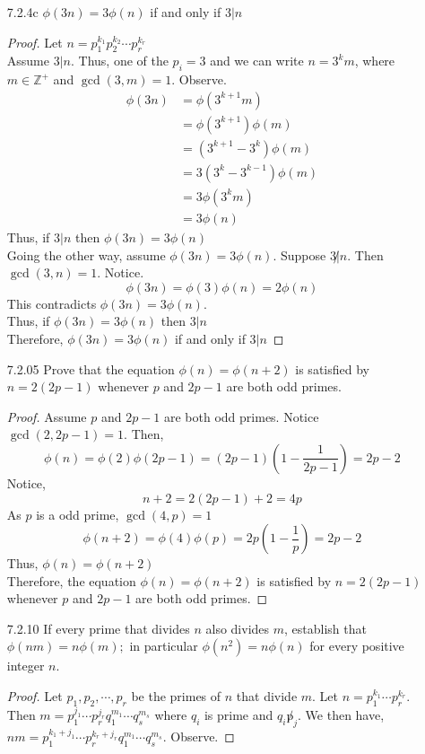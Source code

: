 \documentclass[12pt]{article}
\newcommand{\Z}{\mathds{Z}}
\begin{document}
\begin{enumerate}
	\item[7.2.4c] $ \phi(3n)=3\phi(n) $ if and only if $ 3|n $
	\begin{proof}
		Let $ n = p_1^{k_1}p_2^{k_2} \cdots p_r^{k_r} $\\
		Assume $ 3|n $. Thus, one of the $ p_i = 3 $ and we can write $ n = 3^km $, where $ m \in \Z^+ $ and $ \gcd(3,m) =1 $. Observe. 
		\begin{align*}
			\phi(3n) &= \phi(3^{k+1}m) \\
					 &= \phi(3^{k+1})\phi(m)\\
					 &= (3^{k+1}-3^k)\phi(m)\\
					 &= 3(3^k-3^{k-1})\phi(m)\\
					 &= 3\phi(3^km)\\
					 &= 3\phi(n)
		\end{align*}
		Thus, if $ 3|n $ then $ \phi(3n)=3\phi(n) $ 
		\\
		Going the other way, assume $ \phi(3n)=3\phi(n) $. Suppose $ 3 \not| n $. Then $ \gcd(3,n) =1 $. Notice.
			\[\phi(3n)=\phi(3)\phi(n)=2\phi(n)\]
		This contradicts  $ \phi(3n)=3\phi(n) $.\\
		Thus, if  $ \phi(3n)=3\phi(n) $ then $ 3|n $\\
		Therefore, $ \phi(3n)=3\phi(n) $ if and only if $ 3|n $
	\end{proof}
	\item[7.2.05] Prove that the equation $ \phi(n)=\phi(n+2) $ is satisfied by $ n=2(2p-1) $ whenever $ p $ and $ 2p-1$ are both odd primes.
		\begin{proof}
			Assume $ p $ and $ 2p-1 $ are both odd primes. Notice $ \gcd(2,2p-1)=1 $. Then,
			 \[\phi(n) = \phi(2)\phi(2p-1) = (2p-1)(1-\frac{1}{2p-1}) = 2p-2\]
			Notice, 
			\[n+2=2(2p-1)+2=4p\]
			As $ p $ is a odd prime, $ \gcd(4,p)=1 $
			\[\phi(n+2) = \phi(4)\phi(p)=2p(1-\frac{1}{p})=2p-2\]
			Thus, $ \phi(n)=\phi(n+2) $\\
			Therefore,  the equation $ \phi(n)=\phi(n+2) $ is satisfied by $ n=2(2p-1) $ whenever $ p $ and $ 2p-1$ are both odd primes.
		\end{proof}
	\item[7.2.10] If every prime that divides $ n $ also divides $ m $, establish that $ \phi(nm) = n\phi(m);  $ in particular $ \phi(n^2) = n\phi(n) $ for every positive integer $ n $. 
	\begin{proof}
		Let $ p_1,p_2,\cdots,p_r $ be the primes of $ n $ that divide $ m $. Let $ n = p_1^{k_1}\cdots p_r^{k_r} $. Then $ m = p_1^{j_1}\cdots p_r^{j_r}q_1^{m_1}\cdots q_s^{m_s} $ where $ q_i $ is prime and $ q_i \not p_j $. We then have, $ nm = p_1^{k_1+j_1}\cdots p_r^{k_r+j_r}q_1^{m_1}\cdots q_s^{m_s} $. Observe. 

\end{proof}
\end{enumerate}
\end{document}
